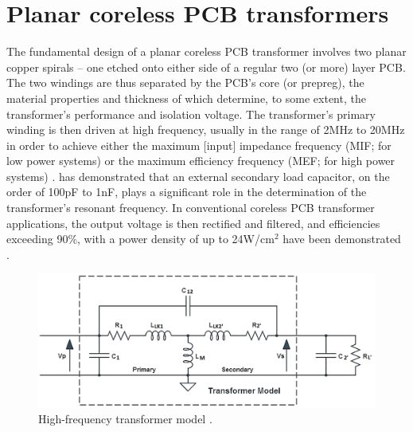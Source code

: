 \documentclass[conference]{IEEEtran}
\begin{document}
\section{Planar coreless PCB transformers}
\label{sec:corelessPCBTransformers}

The fundamental design of a planar coreless PCB transformer involves two planar copper spirals -- one etched onto either side of a regular two (or more) layer PCB.  The two windings are thus separated by the PCB's core (or prepreg), the material properties and thickness of which determine, to some extent, the transformer's performance and isolation voltage.  The transformer's primary winding is then driven at high frequency, usually in the range of 2MHz to 20MHz in order to achieve either the maximum [input] impedance frequency (MIF; for low power systems) or the maximum efficiency frequency (MEF; for high power systems) \cite{TangHuiFundamental,NaturallySoft,OptimalOperation,CorelessGateDrive}.  \cite{TangHuiFundamental} has demonstrated that an external secondary load capacitor, on the order of 100pF to 1nF, plays a significant role in the determination of the transformer's resonant frequency.  In conventional coreless PCB transformer applications, the output voltage is then rectified and filtered, and efficiencies exceeding 90\%, with a power density of up to 24W/cm$^{2}$ have been demonstrated \cite{TangHuiFundamental}.

%
\begin{figure}[t]
	\centering
	\includegraphics[width=1\columnwidth]{./img/HF_Model}
	\caption{High-frequency transformer model \cite{TangHuiFundamental}.}
	\label{fig:HF-Model}
\end{figure}
\end{document}
